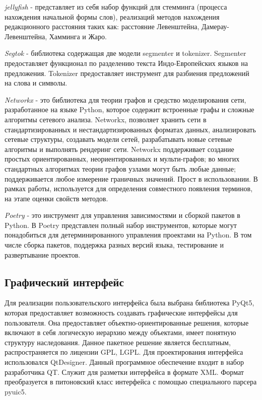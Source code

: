 \textit{jellyfish} -  представляет из себя набор функций для стемминга (процесса нахождения начальной формы слов), реализаций методов нахождения редакционного расстояния таких как: расстояние Левенштейна, Дамерау-Левенштейна, Хамминга и Жаро.

\textit{Segtok} - библиотека содержащая две модели segmenter и tokenizer. Segmenter предоставляет функционал по разделению текста Индо-Европейских языков на предложения.
Tokenizer предоставляет инструмент для разбиения предложений на слова и символы.

\textit{Networkx} - это библиотека для теории графов и средство моделирования сети, разработанное на языке Python, которое содержит встроенные графы и сложные алгоритмы сетевого анализа.
Networkx, позволяет хранить сети в стандартизированных и нестандартизированных форматах данных, анализировать сетевые структуры, создавать модели сетей, разрабатывать новые сетевые алгоритмы и выполнять рендеринг сети.
Networkx поддерживает создание простых ориентированных, неориентированных и мульти-графов; во многих стандартных алгоритмах теории графов узлами могут быть любые данные; поддерживается любое измерение граничных значений.
Прост в использовании.
В рамках работы, используется для определения совместного появления терминов, на этапе оценки свойств методов.

\textit{Poetry} - это инструмент для управления зависимостями и сборкой пакетов в Python.
В Poetry представлен полный набор инструментов, которые могут понадобиться для детерминированного управления проектами на Python. В том числе сборка пакетов, поддержка разных версий языка, тестирование и развертывание проектов.

\subsection{Графический интерфейс}
Для реализации пользовательского интерфейса была выбрана библиотека PyQt5, которая предоставляет возможность создавать графические интерфейсы для пользователя. 
Она предоставляет объектно-ориентированные решения, которые включают в себя логическую иерархию между объектами, имеет понятную структуру наследования.
Данное пакетное решение является бесплатным, распространяется по лицензии GPL, LGPL.
Для проектирования интерфейса использовался QtDesigner.
Данный программное обеспечение  входит в набор разработчика QT.
Служит для разметки интерфейса в формате XML.
Формат преобразуется в питоновский класс интерфейса с помощью специального парсера pyuic5.

